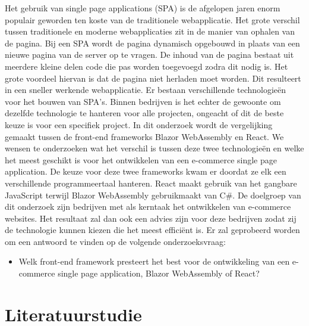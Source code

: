 \documentclass{hogent-article}
\begin{document}
Het gebruik van single page applications (SPA) is de afgelopen jaren enorm populair geworden ten koste van de traditionele webapplicatie. Het grote verschil tussen traditionele en moderne webapplicaties zit in de manier van ophalen van de pagina. Bij een SPA wordt de pagina dynamisch opgebouwd in plaats van een nieuwe pagina van de server op te vragen. De inhoud van de pagina bestaat uit meerdere kleine delen code die pas worden toegevoegd zodra dit nodig is. Het grote voordeel hiervan is dat de pagina niet herladen moet worden. Dit resulteert in een sneller werkende webapplicatie.
\newline\newline
Er bestaan verschillende technologieën voor het bouwen van SPA's. Binnen bedrijven is het echter de gewoonte om dezelfde technologie te hanteren voor alle projecten, ongeacht of dit de beste keuze is voor een specifiek project.
\newline\newline
In dit onderzoek wordt de vergelijking gemaakt tussen de front-end frameworks Blazor WebAssembly en React. We wensen te onderzoeken wat het verschil is tussen deze twee technologieën en welke het meest geschikt is voor het ontwikkelen van een e-commerce single page application. De keuze voor deze twee frameworks kwam er doordat ze elk een verschillende programmeertaal hanteren. React maakt gebruik van het gangbare JavaScript terwijl Blazor WebAssembly gebruikmaakt van C\#. De doelgroep van dit onderzoek zijn bedrijven met als kerntaak het ontwikkelen van e-commerce websites. Het resultaat zal dan ook een advies zijn voor deze bedrijven zodat zij de technologie kunnen kiezen die het meest efficiënt is.
\newline\newline
Er zal geprobeerd worden om een antwoord te vinden op de volgende onderzoeksvraag:

\begin{itemize}
    \item Welk front-end framework presteert het best voor de ontwikkeling van een e-commerce single page application, Blazor WebAssembly of React?
\end{itemize}

\section{Literatuurstudie}%
\label{sec:literatuurstudie}

\end{document}
